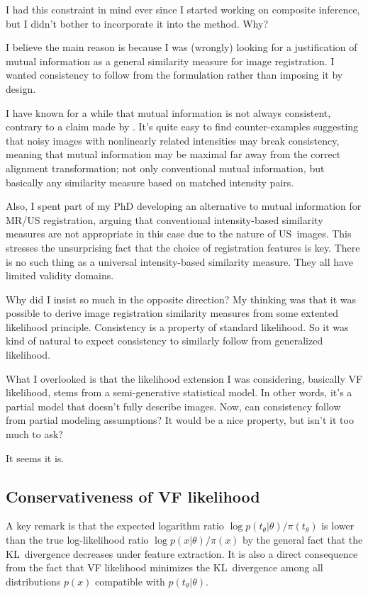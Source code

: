 \documentclass[english]{scrartcl}
\begin{document}
I had this constraint in mind ever since I started working on composite inference, but I didn't bother to incorporate it into the method. Why?

I believe the main reason is because I was (wrongly) looking for a justification of mutual information as a general similarity measure for image registration. I wanted consistency to follow from the formulation rather than imposing it by design.

I have known for a while that mutual information is not always consistent, contrary to a claim made by \cite{Zollei-09}. It's quite easy to find counter-examples suggesting that noisy images with nonlinearly related intensities may break consistency, meaning that mutual information may be maximal far away from the correct alignment transformation; not only conventional mutual information, but basically any similarity measure based on matched intensity pairs.

Also, I spent part of my PhD developing an alternative to mutual information for MR/US registration, arguing that conventional intensity-based similarity measures are not appropriate in this case due to the nature of US~images. This stresses the unsurprising fact that the choice of registration features is key. There is no such thing as a universal intensity-based similarity measure. They all have limited validity domains.

Why did I insist so much in the opposite direction? My thinking was that it was possible to derive image registration similarity measures from some extented likelihood principle. Consistency is a property of standard likelihood. So it was kind of natural to expect consistency to similarly follow from generalized likelihood.

What I overlooked is that the likelihood extension I was considering, basically VF likelihood, stems from a semi-generative statistical model. In other words, it's a partial model that doesn't fully describe images. Now, can consistency follow from partial modeling assumptions? It would be a nice property, but isn't it too much to ask?

It seems it is.

\subsection{Conservativeness of VF likelihood}

A key remark is that the expected logarithm ratio $\log p(t_\theta|\theta)/\pi(t_\theta)$ is lower than the true log-likelihood ratio $\log p(x|\theta)/\pi(x)$ by the general fact that the KL~divergence decreases under feature extraction. It is also a direct consequence from the fact that VF likelihood minimizes the KL~divergence among all distributions $p(x)$ compatible with $p(t_\theta|\theta)$. 
\end{document}
